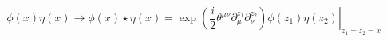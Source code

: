 \begin{equation}
 \left. \phi(x)\eta(x) \to \phi(x) \star \eta(x) = \exp(\frac{i}{2}\theta^{\mu \nu}\partial^{z_1}_\mu\partial^{z_2}_\nu)
\phi(z_1)\eta(z_2)\right|_{z_1=z_2=x}
\end{equation}

